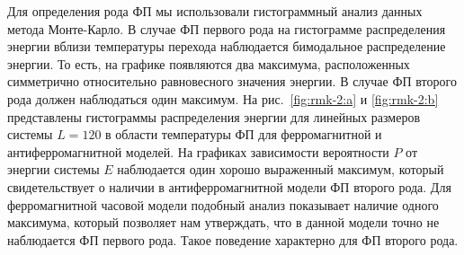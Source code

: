 Для определения рода ФП мы использовали гистограммный анализ данных метода Монте-Карло. В случае ФП первого рода на гистограмме распределения энергии вблизи температуры перехода наблюдается бимодальное распределение энергии. То есть, на графике появляются два максимума, расположенных симметрично относительно равновесного значения энергии. В случае ФП второго рода должен наблюдаться один максимум. На рис.~\ref{fig:rmk-2:a} и \ref{fig:rmk-2:b} представлены гистограммы распределения энергии для линейных размеров системы $L=120$ в области температуры ФП для ферромагнитной и антиферромагнитной моделей. На графиках зависимости вероятности $P$ от энергии системы $E$ наблюдается один хорошо выраженный максимум, который свидетельствует о наличии в антиферромагнитной модели ФП второго рода. Для ферромагнитной часовой модели подобный анализ показывает наличие одного максимума, который позволяет нам утверждать, что в данной модели точно не наблюдается ФП первого рода. Такое поведение характерно для ФП второго рода.


%
%
%
%
%
%
%

